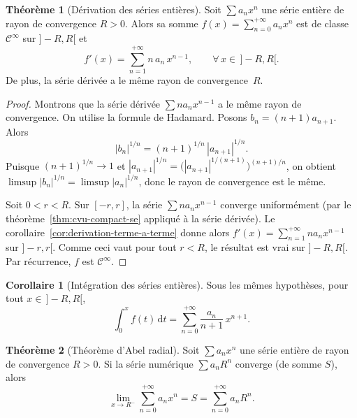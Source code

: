 \documentclass[12pt,a4paper,openany]{book}
\theoremstyle{definition}
\newtheorem{theoreme}{Théorème}[chapter]
\newtheorem{corollaire}{Corollaire}[chapter]
\newcommand{\abs}[1]{\left\lvert #1 \right\rvert}
\newcommand{\dd}{\mathrm{d}}
\begin{document}
\begin{theoreme}[Dérivation des séries entières]\label{thm:derivation-se}
  Soit $\sum a_n x^n$ une série entière de rayon de convergence $R > 0$. Alors sa somme $f(x) = \sum_{n=0}^{+\infty} a_n x^n$ est de classe $\mathcal{C}^\infty$ sur $]-R, R[$ et
  \[
    f'(x) = \sum_{n=1}^{+\infty} n\, a_n\, x^{n-1}, \qquad \forall\, x \in \,]-R, R[.
  \]
  De plus, la série dérivée a le même rayon de convergence~$R$.
\end{theoreme}

\begin{proof}
  Montrons que la série dérivée $\sum n a_n x^{n-1}$ a le même rayon de convergence. On utilise la formule de Hadamard. Posons $b_n = (n+1)a_{n+1}$. Alors
  \[
    \abs{b_n}^{1/n} = (n+1)^{1/n}\,\abs{a_{n+1}}^{1/n}.
  \]
  Puisque $(n+1)^{1/n} \to 1$ et $\abs{a_{n+1}}^{1/n} = \bigl(\abs{a_{n+1}}^{1/(n+1)}\bigr)^{(n+1)/n}$, on obtient $\limsup \abs{b_n}^{1/n} = \limsup \abs{a_n}^{1/n}$, donc le rayon de convergence est le même.

  Soit $0 < r < R$. Sur $[-r,r]$, la série $\sum n a_n x^{n-1}$ converge uniformément (par le théorème~\ref{thm:cvu-compact-se} appliqué à la série dérivée). Le corollaire~\ref{cor:derivation-terme-a-terme} donne alors $f'(x) = \sum_{n=1}^{+\infty} n a_n x^{n-1}$ sur $]-r,r[$. Comme ceci vaut pour tout $r < R$, le résultat est vrai sur $]-R,R[$. Par récurrence, $f$ est $\mathcal{C}^\infty$.
\end{proof}

\begin{corollaire}[Intégration des séries entières]\label{cor:integration-se}
  Sous les mêmes hypothèses, pour tout $x \in \,]-R,R[$,
  \[
    \int_0^x f(t)\,\dd t = \sum_{n=0}^{+\infty} \frac{a_n}{n+1}\,x^{n+1}.
  \]
\end{corollaire}

\begin{theoreme}[Théorème d'Abel radial]\label{thm:abel-radial}
  Soit $\sum a_n x^n$ une série entière de rayon de convergence $R > 0$. Si la série numérique $\sum a_n R^n$ converge (de somme $S$), alors
  \[
    \lim_{x \to R^-} \sum_{n=0}^{+\infty} a_n x^n = S = \sum_{n=0}^{+\infty} a_n R^n.
  \]
\end{theoreme}
\end{document}
